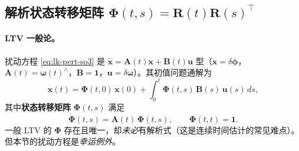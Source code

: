 \subsection{解析状态转移矩阵 \texorpdfstring{$\boldsymbol{\Phi}(t,s)=\mathbf{R}(t)\mathbf{R}(s)^\top$}{Phi=R(t)R(s)^T}}
\label{subsec:lie-stm}

\paragraph{LTV 一般论。}扰动方程 \cref{eq:lk-pert-so3} 是 $\dot{\mathbf{x}}=\mathbf{A}(t)\mathbf{x}+\mathbf{B}(t)\mathbf{u}$ 型（$\mathbf{x}=\delta\boldsymbol{\phi}$，$\mathbf{A}(t)=\boldsymbol{\omega}(t)^\wedge$，$\mathbf{B}=\mathbf{1}$，$\mathbf{u}=\delta\boldsymbol{\omega}$）。其初值问题通解为
\begin{equation}
  \mathbf{x}(t)=\boldsymbol{\Phi}(t,0)\,\mathbf{x}(0)+\int_0^t\boldsymbol{\Phi}(t,s)\,\mathbf{B}(s)\,\mathbf{u}(s)\,ds,
  \label{eq:lk-ltv-sol}
\end{equation}
其中\textbf{状态转移矩阵} $\boldsymbol{\Phi}(t,s)$ 满足
\begin{equation}
  \dot{\boldsymbol{\Phi}}(t,s)=\mathbf{A}(t)\,\boldsymbol{\Phi}(t,s),\qquad \boldsymbol{\Phi}(t,t)=\mathbf{1}.
  \label{eq:lk-stm-def}
\end{equation}
一般 LTV 的 $\boldsymbol{\Phi}$ 存在且唯一，却\emph{未必}有解析式（这是连续时间估计的常见难点）。但本节的扰动方程是\emph{幸运例外}。

